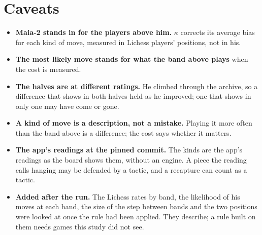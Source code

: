 \documentclass[11pt]{article}
\begin{document}
\section{Caveats}

\begin{itemize}[nosep]
\item \textbf{Maia-2 stands in for the players above him.} $\kappa$ corrects its average bias for
  each kind of move, measured in Lichess players' positions, not in his.
\item \textbf{The most likely move stands for what the band above plays} when the cost is
  measured.
\item \textbf{The halves are at different ratings.} He climbed through the archive, so a
  difference that shows in both halves held as he improved; one that shows in only one may have
  come or gone.
\item \textbf{A kind of move is a description, not a mistake.} Playing it more often than the
  band above is a difference; the cost says whether it matters.
\item \textbf{The app's readings at the pinned commit.} The kinds are the app's readings as the
  board shows them, without an engine. A piece the reading calls hanging may be defended by a
  tactic, and a recapture can count as a tactic.
\item \textbf{Added after the run.} The Lichess rates by band, the likelihood of his moves at each
  band, the size of the step between bands and the two positions were looked at once the rule had
  been applied. They describe; a rule built on them needs games this study did not see.
\end{itemize}
\end{document}
